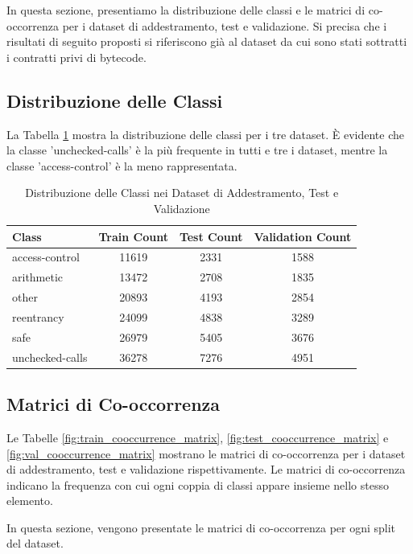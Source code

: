 \documentclass[../../Thesis.tex]{subfiles}
\begin{document}
In questa sezione, presentiamo la distribuzione delle classi e le matrici di co-occorrenza per i dataset di addestramento, test e validazione. Si precisa che i risultati di seguito proposti si riferiscono già al dataset da cui sono stati sottratti i contratti privi di bytecode.

\subsection{Distribuzione delle Classi}

La Tabella \ref{tab:class_distribution} mostra la distribuzione delle classi per i tre dataset. È evidente che la classe 'unchecked-calls' è la più frequente in tutti e tre i dataset, mentre la classe 'access-control' è la meno rappresentata.

\begin{table}[h!]
    \centering
    \caption{Distribuzione delle Classi nei Dataset di Addestramento, Test e Validazione}
    \label{tab:class_distribution}
    \begin{tabular}{|l|c|c|c|}
        \hline
        \textbf{Class} & \textbf{Train Count} & \textbf{Test Count} & \textbf{Validation Count} \\
        \hline
        access-control & 11619 & 2331 & 1588 \\
        arithmetic & 13472 & 2708 & 1835 \\
        other & 20893 & 4193 & 2854 \\
        reentrancy & 24099 & 4838 & 3289 \\
        safe & 26979 & 5405 & 3676 \\
        unchecked-calls & 36278 & 7276 & 4951 \\
        \hline
    \end{tabular}
\end{table}

\subsection{Matrici di Co-occorrenza}
Le Tabelle \ref{fig:train_cooccurrence_matrix}, \ref{fig:test_cooccurrence_matrix} e \ref{fig:val_cooccurrence_matrix} mostrano le matrici di co-occorrenza per i dataset di addestramento, test e validazione rispettivamente. Le matrici di co-occorrenza indicano la frequenza con cui ogni coppia di classi appare insieme nello stesso elemento.

In questa sezione, vengono presentate le matrici di co-occorrenza per ogni split del dataset.
\end{document}
